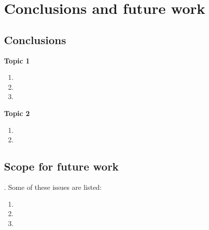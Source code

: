 
\chapter{Conclusions and future work}

\label{Chapter8} %


\section{Conclusions}

\lipsum[1]

\textbf{Topic 1}

\begin{enumerate}
    \item \lipsum[1]
    
    \item \lipsum[1]
    
    \item \lipsum[1]

\end{enumerate}

\textbf{Topic 2}

\begin{enumerate}

    \item \lipsum[1]
    
    \item \lipsum[1]
    
    
    
\end{enumerate}

\section{Scope for future work}

\lipsum[1]. Some of these issues are listed:

\begin{enumerate}

    \item \lipsum[1]
    \item \lipsum[1]
    \item \lipsum[1]
    
\end{enumerate}

